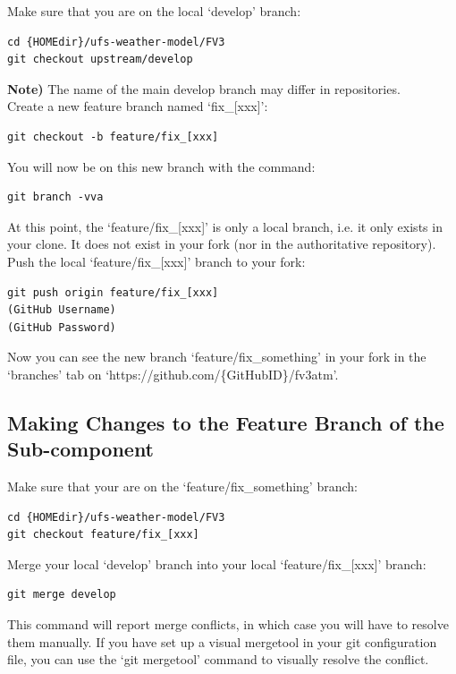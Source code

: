 \documentclass[11pt,fleqn]{report}              %
\begin{document}
Make sure that you are on the local `develop' branch:
\lstset{language=bash}   
\begin{lstlisting}[frame=trBL]
cd {HOMEdir}/ufs-weather-model/FV3
git checkout upstream/develop
\end{lstlisting}
{\bf Note)} The name of the main develop branch may differ in repositories. \\

Create a new feature branch named `fix\_[xxx]':
\lstset{language=bash}   
\begin{lstlisting}[frame=trBL]
git checkout -b feature/fix_[xxx]
\end{lstlisting}
You will now be on this new branch with the command:
\lstset{language=bash}   
\begin{lstlisting}[frame=trBL]
git branch -vva
\end{lstlisting}
At this point, the `feature/fix\_[xxx]' is only a local branch, i.e. it only exists in your clone. It does not exist in your fork (nor in the authoritative repository). \\

Push the local `feature/fix\_[xxx]' branch to your fork:
\lstset{language=bash}   
\begin{lstlisting}[frame=trBL]
git push origin feature/fix_[xxx]
(GitHub Username)
(GitHub Password)
\end{lstlisting}
Now you can see the new branch `feature/fix\_something' in your fork in the `branches' tab on `https://github.com/\{GitHubID\}/fv3atm'. 



\subsection{Making Changes to the Feature Branch of the Sub-component}

Make sure that your are on the `feature/fix\_something' branch:
\lstset{language=bash}   
\begin{lstlisting}[frame=trBL]
cd {HOMEdir}/ufs-weather-model/FV3
git checkout feature/fix_[xxx]
\end{lstlisting}

Merge your local `develop' branch into your local `feature/fix\_[xxx]' branch:
\lstset{language=bash}   
\begin{lstlisting}[frame=trBL]
git merge develop
\end{lstlisting}
This command will report merge conflicts, in which case you will have to resolve them manually. If you have set up a visual mergetool in your git configuration file, you can use the `git mergetool' command to visually resolve the conflict. \\
\end{document}
